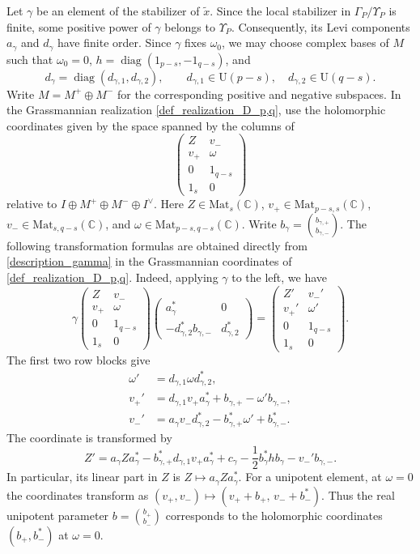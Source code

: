 \documentclass[11pt]{amsart}
\theoremstyle{plain}
\theoremstyle{definition}
\numberwithin{equation}{section}
\def\U{\mathrm{U}}
\newcommand{\bbC}{\mathbb{C}}
\newcommand{\Mat}{\mathrm{Mat}}
\begin{document}
Let $\gamma$ be an element of the stabilizer of $\tilde{x}$.
Since the local stabilizer in $\Gamma_P/\Upsilon_P$ is finite,
some positive power of $\gamma$ belongs to $\Upsilon_P$.
Consequently, its Levi components $a_\gamma$ and $d_\gamma$
have finite order.
Since $\gamma$ fixes $\omega_0$, we may choose complex bases
of $M$ such that $\omega_0=0$,
$h=\operatorname{diag}(1_{p-s},-1_{q-s})$, and
\[
d_\gamma=\operatorname{diag}(d_{\gamma,1},d_{\gamma,2}),
\qquad
d_{\gamma,1}\in\U(p-s),\quad d_{\gamma,2}\in\U(q-s).
\]
Write $M=M^+\oplus M^-$ for the corresponding positive
and negative subspaces.
In the Grassmannian realization
\eqref{def_realization_D_p,q}, use the holomorphic coordinates
given by the space spanned by the columns of
\[
\begin{pmatrix}
Z & v_-\\
v_+ & \omega\\
0 & 1_{q-s}\\
1_s & 0
\end{pmatrix}
\]
relative to $I\oplus M^+\oplus M^-\oplus I^\vee$.
Here $Z\in\Mat_s(\bbC)$,
$v_+\in\Mat_{p-s,s}(\bbC)$,
$v_-\in\Mat_{s,q-s}(\bbC)$, and
$\omega\in\Mat_{p-s,q-s}(\bbC)$.
Write
$b_\gamma=\binom{b_{\gamma,+}}{b_{\gamma,-}}$.
The following transformation formulas are obtained directly
from \eqref{description_gamma} in the Grassmannian coordinates
of \eqref{def_realization_D_p,q}.
Indeed, applying $\gamma$ to the left, we have
\[
\gamma
\begin{pmatrix}
Z & v_-\\
v_+ & \omega\\
0 & 1_{q-s}\\
1_s & 0
\end{pmatrix}
\begin{pmatrix}
a_\gamma^* & 0\\
-d_{\gamma,2}^*b_{\gamma,-} & d_{\gamma,2}^*
\end{pmatrix}
=
\begin{pmatrix}
Z' & v_-'\\
v_+' & \omega'\\
0 & 1_{q-s}\\
1_s & 0
\end{pmatrix}.
\]
The first two row blocks give
\[
\begin{aligned}
\omega'
 &=d_{\gamma,1}\omega d_{\gamma,2}^*,\\
v_+'
 &=d_{\gamma,1}v_+a_\gamma^*
   +b_{\gamma,+}-\omega'b_{\gamma,-},\\
v_-'
 &=a_\gamma v_-d_{\gamma,2}^*
   -b_{\gamma,+}^*\omega'+b_{\gamma,-}^*.
\end{aligned}
\]
The coordinate is transformed by
\[
Z'
=
a_\gamma Za_\gamma^*
-b_{\gamma,+}^*d_{\gamma,1}v_+a_\gamma^*
+c_\gamma-\frac12 b_\gamma^*h b_\gamma
-v_-'b_{\gamma,-}.
\]
In particular, its linear part in $Z$ is
$Z\mapsto a_\gamma Za_\gamma^*$.
For a unipotent element, at $\omega=0$ the
coordinates transform as $(v_+,v_-)\mapsto
(v_++b_+,\,v_-+b_-^*)$.
Thus the real unipotent parameter
$b=\binom{b_+}{b_-}$ corresponds to the holomorphic
coordinates $(b_+,b_-^*)$ at $\omega=0$.
\end{document}
